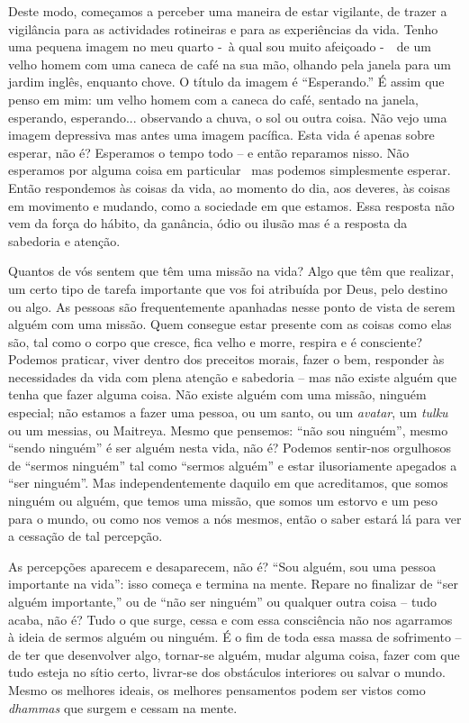 Deste modo, começamos a perceber uma maneira de estar vigilante, de
trazer a vigilância para as actividades rotineiras e para as
experiências da vida. Tenho uma pequena imagem no meu quarto -~à qual
sou muito afeiçoado -~~de um velho homem com uma caneca de café na sua
mão, olhando pela janela para um jardim inglês, enquanto chove. O título
da imagem é ``Esperando.'' É assim que penso em mim: um velho homem com
a caneca do café, sentado na janela, esperando, esperando... observando
a chuva, o sol ou outra coisa. Não vejo uma imagem depressiva mas antes
uma imagem pacífica. Esta vida é apenas sobre esperar, não é? Esperamos
o tempo todo -- e então reparamos nisso. Não esperamos por alguma coisa
em particular ~mas podemos simplesmente esperar. Então respondemos às
coisas da vida, ao momento do dia, aos deveres, às coisas em movimento e
mudando, como a sociedade em que estamos. Essa resposta não vem da força
do hábito, da ganância, ódio ou ilusão mas é a resposta da sabedoria e
atenção.

Quantos de vós sentem que têm uma missão na vida? Algo que têm que
realizar, um certo tipo de tarefa importante que vos foi atribuída por
Deus, pelo destino ou algo. As pessoas são frequentemente apanhadas
nesse ponto de vista de serem alguém com uma missão. Quem consegue estar
presente com as coisas como elas são, tal como o corpo que cresce, fica
velho e morre, respira e é consciente? Podemos praticar, viver dentro
dos preceitos morais, fazer o bem, responder às necessidades da vida com
plena atenção e sabedoria -- mas não existe alguém que tenha que fazer
alguma coisa. Não existe alguém com uma missão, ninguém especial; não
estamos a fazer uma pessoa, ou um santo, ou um \emph{avatar}, um
\emph{tulku} ou um messias, ou Maitreya. Mesmo que pensemos: ``não sou
ninguém'', mesmo ``sendo ninguém'' é ser alguém nesta vida, não é?
Podemos sentir-nos orgulhosos de ``sermos ninguém'' tal como ``sermos
alguém'' e estar ilusoriamente apegados a ``ser ninguém''. Mas
independentemente daquilo em que acreditamos, que somos ninguém ou
alguém, que temos uma missão, que somos um estorvo e um peso para o
mundo, ou como nos vemos a nós mesmos, então o saber estará lá para ver
a cessação de tal percepção.

As percepções aparecem e desaparecem, não é? ``Sou alguém, sou uma
pessoa importante na vida'': isso começa e termina na mente. Repare no
finalizar de ``ser alguém importante,'' ou de ``não ser ninguém'' ou
qualquer outra coisa -- tudo acaba, não é? Tudo o que surge, cessa e com
essa consciência não nos agarramos à ideia de sermos alguém ou ninguém.
É o fim de toda essa massa de sofrimento -- de ter que desenvolver algo,
tornar-se alguém, mudar alguma coisa, fazer com que tudo esteja no sítio
certo, livrar-se dos obstáculos interiores ou salvar o mundo. Mesmo os
melhores ideais, os melhores pensamentos podem ser vistos como
\emph{dhammas} que surgem e cessam na mente.

